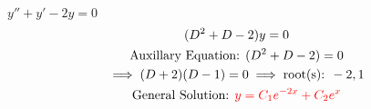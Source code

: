 \item [1.] $y''+y'-2y=0$
\begin{gather*}
    (D^2+D-2)y=0\\
    \text{Auxillary Equation: }(D^2+D-2)=0\\
    \implies (D+2)(D-1)=0 \implies \text{root(s): }-2,1\\
    \text{General Solution: } \textcolor{red}{y=C_1e^{-2x}+C_2e^x}
\end{gather*}